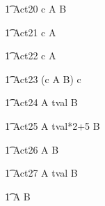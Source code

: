 \begin{circusaction}
	\t1 Act20 \circdef c \then  A \circtimedinterrupt {} \rcirctime B \\
\end{circusaction}

\begin{circusaction}
	\t1 Act21 \circdef c \then  A \circtimedinterrupt {} \rcirctime \Skip \\
\end{circusaction}

\begin{circusaction}
	\t1 Act22 \circdef c \then  A \circtimedinterrupt {} \rcirctime \Stop \\
\end{circusaction}

\begin{circusaction}
	\t1 Act23 \circdef (c \then A \circtimedinterrupt {} \rcirctime B) \circhide c \\
\end{circusaction}

\begin{circusaction}
	\t1 Act24 \circdef A \circtimedinterrupt \lcirctime tval \rcirctime B \\
\end{circusaction}

\begin{circusaction}
	\t1 Act25 \circdef A \circtimedinterrupt \lcirctime tval*2+5 \rcirctime B \\
\end{circusaction}
 

\begin{circusaction}
    	\t1 Act26 \circdef A \circtimedinterrupt {}  \rcirctime B \\
\end{circusaction}

\begin{circusaction}
    	\t1 Act27 \circdef A \circtimedinterrupt {} \upto tval \rcirctime B \\
\end{circusaction}

\begin{circusaction}
        \t1 \circspot A \circseq B\\
\end{circusaction}

\begin{circus}
    \circend
\end{circus}


